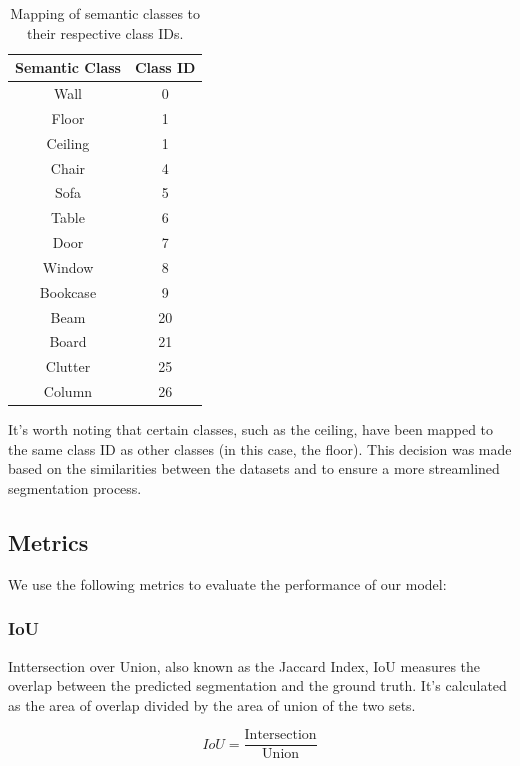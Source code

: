 \documentclass[11pt, a4paper,oneside,chapterprefix=false]{scrbook}
\begin{document}
\begin{table}[h]
    \centering
    \begin{tabular}{|c|c|}
        \hline
        \textbf{Semantic Class} & \textbf{Class ID} \\
        \hline
        Wall & 0 \\
        Floor & 1 \\
        Ceiling & 1 \\
        Chair & 4 \\
        Sofa & 5 \\
        Table & 6 \\
        Door & 7 \\
        Window & 8 \\
        Bookcase & 9 \\
        Beam & 20 \\
        Board & 21 \\
        Clutter & 25 \\
        Column & 26 \\
        \hline
    \end{tabular}
    \caption{Mapping of semantic classes to their respective class IDs.}
    \label{tab:semantic_classes}
\end{table}

It's worth noting that certain classes, such as the ceiling, have been mapped to the same class ID as other classes (in this case, the floor). This decision was made based on the similarities between the datasets and to ensure a more streamlined segmentation process.

\subsection{Metrics}

We use the following metrics to evaluate the performance of our model:

\subsubsection{IoU}

Inttersection over Union, also known as the Jaccard Index, IoU measures the overlap between the predicted segmentation and the ground truth. It's calculated as the area of overlap divided by the area of union of the two sets.

\begin{equation}
	IoU = \frac{\text{Intersection}}{\text{Union}}
\end{equation}
\end{document}
